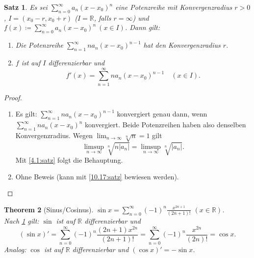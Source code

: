 \documentclass[12pt]{extreport} %
\newcommand{\R}{\mathbb{R}}
\theoremstyle{named}
\newtheorem{unnamedtheorem}{Theorem} \counterwithin{unnamedtheorem}{chapter}
\theoremstyle{itshape}
\newtheorem{satz}[unnamedtheorem]{Satz}
\theoremstyle{normal}
\begin{document}
{\begin{satz} \label{9.12:satz}
	Es sei $\sum_{n=0}^{\infty} a_{n} (x - x_{0})^{n}$ eine Potenzreihe mit Konvergenzradius $r > 0$, $I = (x_{0}- r, x_{0} + r)$ ($I = \R$, falls $r = \infty$) und 
	$f(x) \coloneqq \sum_{n = 0}^{\infty} a_{n} (x - x_{0})^{n} ~(x \in I)$. Dann gilt:
	\begin{enumerate}
		\item Die Potenzreihe $\sum_{n=1}^{\infty} n a_{n} (x - x_{0})^{n-1}$ hat den Konvergenzradius $r$.
		\item $f$ ist auf $I$ differenzierbar und
			$$ f'(x) = \sum_{n=1}^{\infty} n a_{n} (x - x_{0})^{n-1} \quad (x \in I). $$
	\end{enumerate}
\end{satz}

\begin{proof} ~\
	\begin{enumerate}
		\item Es gilt: $\sum_{n=1}^{\infty} n a_{n} (x - x_{0})^{n-1}$ konvergiert genau dann, wenn $\sum_{n=1}^{\infty} n a_{n} (x - x_{0})^{n}$
		konvergiert. Beide Potenzreihen haben also denselben Konvergenzradius. Wegen $\lim_{n \to \infty} \sqrt[n]{n} =1$ gilt
		$$
		\limsup_{n \to \infty} \sqrt[n]{n |a_n|}= \limsup_{n \to \infty} \sqrt[n]{|a_n|}.
		$$
		Mit \ref{4.1:satz} folgt die Behauptung.
		\item Ohne Beweis (kann mit \ref{10.17:satz} bewiesen werden).
	\end{enumerate}
\end{proof}

\begin{unnamedtheorem}[Sinus/Cosinus] \label{9.13:prop-SinusCosinus}
$\sin x =\sum_{n=0}^{\infty} (-1)^{n} \frac{x^{2n+1}}{(2n+1)!}$ $(x \in \R)$. \\
Nach \ref{9.12:satz} gilt: $\sin$ ist auf $\R$ differenzierbar und 
	$$ (\sin x)' = \sum_{n=0}^{\infty} (-1)^{n} \frac{(2n+1) x^{2n}}{(2n + 1)!} = \sum_{n=0}^{\infty} (-1)^{n} \frac{x^{2n}}{(2n)!} = \cos x. $$
	Analog: $\cos$ ist auf $\R$ differenzierbar und $(\cos x)' = - \sin x$.
\end{unnamedtheorem}
	
}
\end{document}
